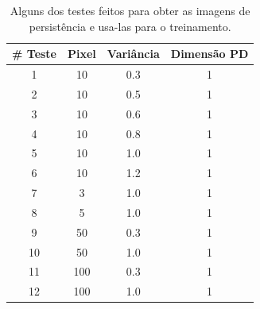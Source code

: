 \begin{table}[!htbp]
    \centering
    \caption{Alguns dos testes feitos para obter as imagens de persistência e usa-las para o
             treinamento.}
    \label{tab:run_numb}
    \begin{tabular}{@{}cccc@{}}
    \toprule
    \textbf{\# Teste} & \textbf{Pixel} & \textbf{Variância} & \textbf{Dimensão PD} \\
    \midrule
    1                   & 10                  & 0.3             & 1                     \\
    2                   & 10                  & 0.5             & 1                     \\
    3                   & 10                  & 0.6             & 1                     \\
    4                   & 10                  & 0.8             & 1                     \\
    5                   & 10                  & 1.0             & 1                     \\
    6                   & 10                  & 1.2             & 1                     \\
    7                   & 3                   & 1.0             & 1                     \\
    8                   & 5                   & 1.0             & 1                     \\
    9                   & 50                  & 0.3             & 1                     \\
    10                  & 50                  & 1.0             & 1                     \\
    11                  & 100                 & 0.3             & 1                     \\
    12                  & 100                 & 1.0             & 1                     \\

\end{tabular}
\end{table}
